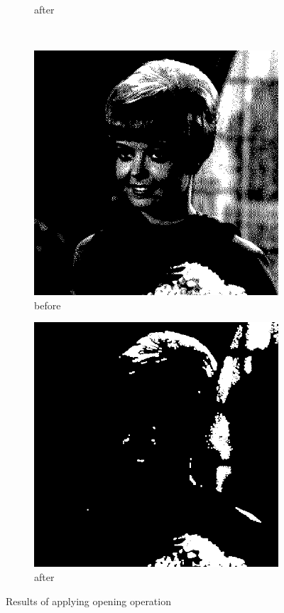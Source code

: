 \documentclass[12pt]{article}
\renewcommand{\subfiguresize}{.25\textwidth}
\begin{document}
\begin{figure}[H]
\begin{subfigure}[t]{\subfiguresize}
        \caption{after}
    \end{subfigure}\\[1em]
    \begin{subfigure}[t]{\subfiguresize}\centering
        \includegraphics[width=\textwidth]{img/magda/girlbw.png}
        \caption{before}
    \end{subfigure}
    \hspace{2em}
    \begin{subfigure}[t]{\subfiguresize}\centering
         \includegraphics[width=\textwidth]{img/magda/output2.png}
        \caption{after}
    \end{subfigure}
    \caption{Results of applying opening operation}
\end{figure}  
\end{document}
